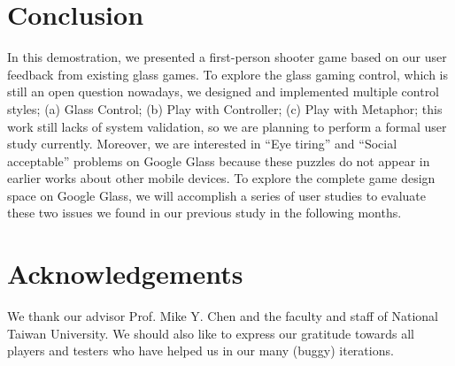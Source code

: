 \documentclass{sigchi}
\begin{document}
\section{Conclusion}
In this demostration, we presented a first-person shooter game based on our user feedback from existing glass games. To explore the glass gaming control, which is still an open question nowadays, we designed and implemented multiple control styles; (a) Glass Control; (b) Play with Controller; (c) Play with Metaphor; this work still lacks of system validation, so we are planning to perform a formal user study currently. Moreover, we are interested in ``Eye tiring'' and ``Social acceptable'' problems on Google Glass because these puzzles do not appear in earlier works about other mobile devices.
To explore the complete game design space on Google Glass, we will accomplish a series of user studies to evaluate these two issues we found in our previous study in the following months. 


\section{Acknowledgements}
We thank our advisor Prof. Mike Y. Chen and the faculty and staff of National Taiwan University. We should also like to express our gratitude towards all players and testers who have helped us in our many (buggy) iterations.

\balance



\end{document}
